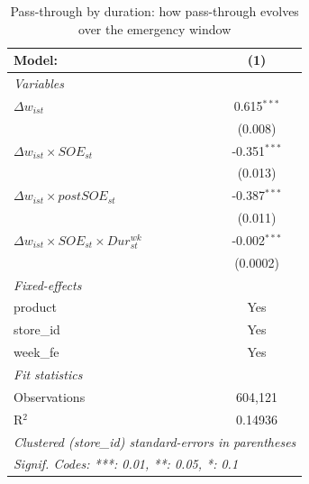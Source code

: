 
\begin{table}[htbp]
   \caption{\label{tab:passthrough_duration} Pass-through by duration: how pass-through evolves over the emergency window}
   \centering
   \begin{tabular}{lc}
      \tabularnewline \midrule \midrule
      Model:                                                   & (1)\\  
      \midrule
      \emph{Variables}\\
      $\Delta w_{ist}$                                         & 0.615$^{***}$\\   
                                                               & (0.008)\\   
      $\Delta w_{ist} \times SOE_{st}$                         & -0.351$^{***}$\\   
                                                               & (0.013)\\   
      $\Delta w_{ist} \times postSOE_{st}$                     & -0.387$^{***}$\\   
                                                               & (0.011)\\   
      $\Delta w_{ist} \times SOE_{st} \times Dur^{wk}_{st}$    & -0.002$^{***}$\\   
                                                               & (0.0002)\\   
      \midrule
      \emph{Fixed-effects}\\
      product                                                  & Yes\\  
      store\_id                                                & Yes\\  
      week\_fe                                                 & Yes\\  
      \midrule
      \emph{Fit statistics}\\
      Observations                                             & 604,121\\  
      R$^2$                                                    & 0.14936\\  
      \midrule \midrule
      \multicolumn{2}{l}{\emph{Clustered (store\_id) standard-errors in parentheses}}\\
      \multicolumn{2}{l}{\emph{Signif. Codes: ***: 0.01, **: 0.05, *: 0.1}}\\
   \end{tabular}
   

\end{table}
